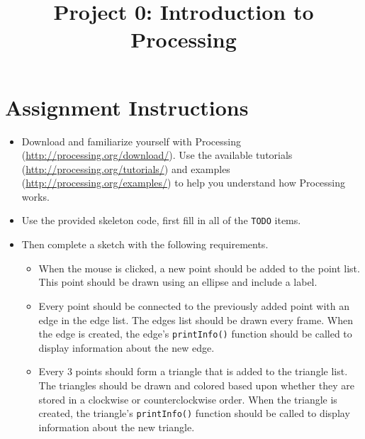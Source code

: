 \documentclass[a4paper,12pt]{article}
\title{Project 0: Introduction to Processing}
\begin{document}
\maketitle

\projectGroundRules

\projectSubmission


\vspace{5pt}
\section{Assignment Instructions}

\vspace{5pt}

\begin{itemize}

\item Download and familiarize yourself with Processing (\url{http://processing.org/download/}). Use the available tutorials (\url{http://processing.org/tutorials/}) and examples (\url{http://processing.org/examples/}) to help you understand how Processing works.
 

\item Use the provided skeleton code, first fill in all of the \texttt{TODO} items.
\item Then complete a sketch with the following requirements.

\begin{minipage}[b]{0.58\textwidth}
\begin{itemize}

\item When the mouse is clicked, a new point should be added to the point list. This point should be drawn using an ellipse and include a label.

\item Every point should be connected to the previously added point with an edge in the edge list. The edges list should be drawn every frame. When the edge is created, the edge's \texttt{printInfo()} function should be called to display information about the new edge.

\item Every 3 points should form a triangle that is added to the triangle list. The triangles should be drawn and colored based upon whether they are stored in a clockwise or counterclockwise order. When the triangle is created, the triangle's \texttt{printInfo()} function should be called to display information about the new triangle.


\end{itemize}
\end{minipage}
\end{itemize}
\end{document}
